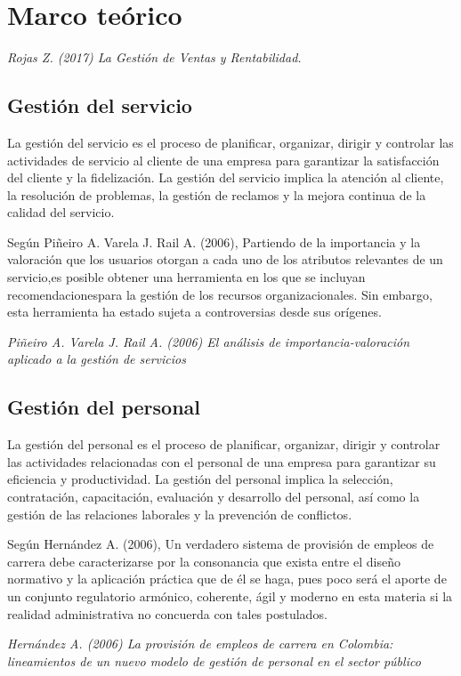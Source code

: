 \documentclass{article}
\newenvironment{marcoTeorico}{\section{Marco teórico}}{}
\begin{document}
\begin{marcoTeorico}
  \begin{flushright}
    \textit{  Rojas Z. (2017) La Gestión de Ventas y Rentabilidad.}
  \end{flushright}

\newpage
  \subsection{Gestión del servicio}

  La gestión del servicio es el proceso de planificar, organizar, dirigir y controlar las actividades de servicio al cliente de una empresa para garantizar la satisfacción del cliente y la fidelización. La gestión del servicio implica la atención al cliente, la resolución de problemas, la gestión de reclamos y la mejora continua de la calidad del servicio.

  Según  Piñeiro A. Varela J. Rail A. (2006), Partiendo de la importancia y la valoración que los usuarios otorgan a cada uno de los atributos relevantes de un servicio,es posible obtener una herramienta en los que se incluyan recomendacionespara la gestión de los recursos organizacionales. Sin embargo, esta herramienta ha estado sujeta a controversias desde sus orígenes.

  \begin{flushright}
    \textit{ Piñeiro A. Varela J. Rail A. (2006) El análisis de importancia-valoración aplicado a la gestión de servicios}
  \end{flushright}

  \subsection{Gestión del personal}

    La gestión del personal es el proceso de planificar, organizar, dirigir y controlar las actividades relacionadas con el personal de una empresa para garantizar su eficiencia y productividad. La gestión del personal implica la selección, contratación, capacitación, evaluación y desarrollo del personal, así como la gestión de las relaciones laborales y la prevención de conflictos.

    Según Hernández A. (2006), Un verdadero sistema de provisión de empleos de carrera debe caracterizarse por la consonancia que exista entre el diseño normativo y la aplicación práctica que de él se haga, pues poco será el aporte de 
    un conjunto regulatorio armónico, coherente, ágil y moderno en esta materia si la realidad 
    administrativa no concuerda con tales postulados.

    \begin{flushright}
      \textit{Hernández A. (2006) La provisión de empleos de carrera en Colombia: lineamientos de un nuevo modelo de gestión de personal en el sector público}
    \end{flushright}

\end{marcoTeorico}
\end{document}
